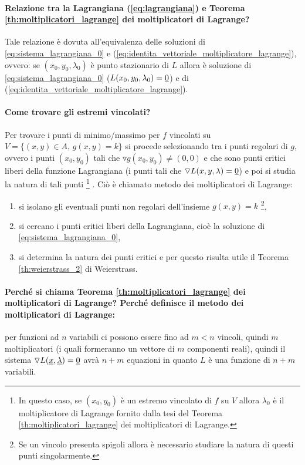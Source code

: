 \paragraph{Relazione tra la Lagrangiana (\ref{eq:lagrangiana}) e Teorema \ref{th:moltiplicatori_lagrange} dei moltiplicatori di Lagrange?} Tale relazione è dovuta all'equivalenza delle soluzioni di \ref{eq:sistema_lagrangiana_0} e (\ref{eq:identita_vettoriale_moltiplicatore_lagrange}), ovvero: se $(x_0,y_0,\lambda_0)$ è punto stazionario di $L$ allora è soluzione di \ref{eq:sistema_lagrangiana_0} ($L(x_0,y_0,\lambda_0) =\uline 0$) e di (\ref{eq:identita_vettoriale_moltiplicatore_lagrange}).

\paragraph{Come trovare gli estremi vincolati?} Per trovare i punti di minimo/massimo per $f$ vincolati su $V=\{(x,y)\in A,\, g(x,y)=k\}$ si procede selezionando tra i punti regolari di $g$, ovvero i punti $(x_0, y_0)$ tali che $\triangledown g(x_0, y_0)\neq(0,0)$ e che sono punti critici liberi della funzione Lagrangiana (i punti tali che $\triangledown L(x,y,\lambda) = \uline 0$) e poi si studia la natura di tali punti \footnote{In questo caso, se $(x_0, y_0)$ è un estremo vincolato di $f$ su $V$ allora $\lambda_0$ è il moltiplicatore di Lagrange fornito dalla tesi del Teorema \ref{th:moltiplicatori_lagrange} dei moltiplicatori di Lagrange.} . Ciò è chiamato metodo dei moltiplicatori di Lagrange:
\begin{enumerate}
	\item si isolano gli eventuali punti non regolari dell'insieme $g(x,y) = k$ \footnote{Se un vincolo presenta spigoli allora è necessario studiare la natura di questi punti singolarmente.},
	\item si cercano i punti critici liberi della Lagrangiana, cioè la soluzione di \ref{eq:sistema_lagrangiana_0},
	\item si determina la natura dei punti critici e per questo risulta utile il Teorema \ref{th:weierstrass_2} di Weierstrass.
\end{enumerate}

\paragraph{Perché si chiama Teorema \ref{th:moltiplicatori_lagrange} dei moltiplicatori di Lagrange? Perché definisce il metodo dei moltiplicatori di Lagrange:} per funzioni ad $n$ variabili ci possono essere fino ad $m <n$ vincoli, quindi $m$ moltiplicatori (i quali formeranno un vettore di $m$ componenti reali), quindi il sistema $\triangledown L(\uline x, \uline \lambda)=\uline{0}$ avrà $n+m$ equazioni in quanto $L$ è una funzione di $n+m$ variabili. 

